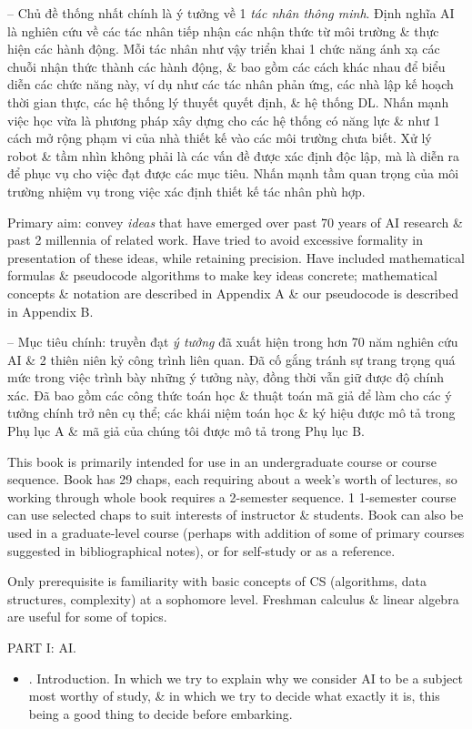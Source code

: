 \documentclass{article}
\begin{document}
\begin{itemize}
\begin{itemize}
		-- Chủ đề thống nhất chính là ý tưởng về 1 {\it tác nhân thông minh}. Định nghĩa AI là nghiên cứu về các tác nhân tiếp nhận các nhận thức từ môi trường \& thực hiện các hành động. Mỗi tác nhân như vậy triển khai 1 chức năng ánh xạ các chuỗi nhận thức thành các hành động, \& bao gồm các cách khác nhau để biểu diễn các chức năng này, ví dụ như các tác nhân phản ứng, các nhà lập kế hoạch thời gian thực, các hệ thống lý thuyết quyết định, \& hệ thống DL. Nhấn mạnh việc học vừa là phương pháp xây dựng cho các hệ thống có năng lực \& như 1 cách mở rộng phạm vi của nhà thiết kế vào các môi trường chưa biết. Xử lý robot \& tầm nhìn không phải là các vấn đề được xác định độc lập, mà là diễn ra để phục vụ cho việc đạt được các mục tiêu. Nhấn mạnh tầm quan trọng của môi trường nhiệm vụ trong việc xác định thiết kế tác nhân phù hợp.

		Primary aim: convey {\it ideas} that have emerged over past 70 years of AI research \& past 2 millennia of related work. Have tried to avoid excessive formality in presentation of these ideas, while retaining precision. Have included mathematical formulas \& pseudocode algorithms to make key ideas concrete; mathematical concepts \& notation are described in Appendix A \& our pseudocode is described in Appendix B.

		-- Mục tiêu chính: truyền đạt {\it ý tưởng} đã xuất hiện trong hơn 70 năm nghiên cứu AI \& 2 thiên niên kỷ công trình liên quan. Đã cố gắng tránh sự trang trọng quá mức trong việc trình bày những ý tưởng này, đồng thời vẫn giữ được độ chính xác. Đã bao gồm các công thức toán học \& thuật toán mã giả để làm cho các ý tưởng chính trở nên cụ thể; các khái niệm toán học \& ký hiệu được mô tả trong Phụ lục A \& mã giả của chúng tôi được mô tả trong Phụ lục B.

		This book is primarily intended for use in an undergraduate course or course sequence. Book has 29 chaps, each requiring about a week's worth of lectures, so working through whole book requires a 2-semester sequence. 1 1-semester course can use selected chaps to suit interests of instructor \& students. Book can also be used in a graduate-level course (perhaps with addition of some of primary courses suggested in bibliographical notes), or for self-study or as a reference.

		Only prerequisite is familiarity with basic concepts of CS (algorithms, data structures, complexity) at a sophomore level. Freshman calculus \& linear algebra are useful for some of topics.
	\end{itemize}
	PART I: AI.
	\begin{itemize}
		\item {. Introduction.} In which we try to explain why we consider AI to be a subject most worthy of study, \& in which we try to decide what exactly it is, this being a good thing to decide before embarking.


\end{itemize}
\end{itemize}
\end{document}
